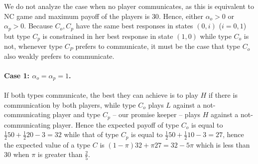 \documentclass[12pt]{article}
\theoremstyle{break}
\begin{document}
	We do not analyze the case when no player communicates, as this is equivalent to NC game and maximum payoff of the players is $30$. Hence, either $\alpha_o>0$ or $\alpha_p>0$. Because $C_o,C_p$ have the same best responses in states $(0,i)$ ($i=0,1$) but type $C_p$ is constrained in her best response in state $(1,0)$ while type $C_o$ is not, whenever type $C_P$ prefers to communicate, it must be the case that type $C_o$ also weakly prefers to communicate. 
	
	
	\paragraph{Case 1: $\alpha_o = \alpha_p = 1$.} If both types communicate, the best they can achieve is to play $H$ if there is communication by both players, while type $C_o$ plays $L$ against a not-communicating player and type $C_p$ -- our promise keeper -- plays $H$ against a not-communicating player. Hence the expected payoff of type $C_o$ is equal to $\frac{1}{2}50+\frac{1}{2}20-3=32$ while that of type $C_p$ is equal to $\frac{1}{2}50+\frac{1}{2}10-3=27$, hence the expected value of a type $C$ is $(1-\pi)32+\pi 27=32-5\pi$ which is less than $30$ when $\pi$ is greater than $\frac{2}{5}$. 
	
\end{document}
